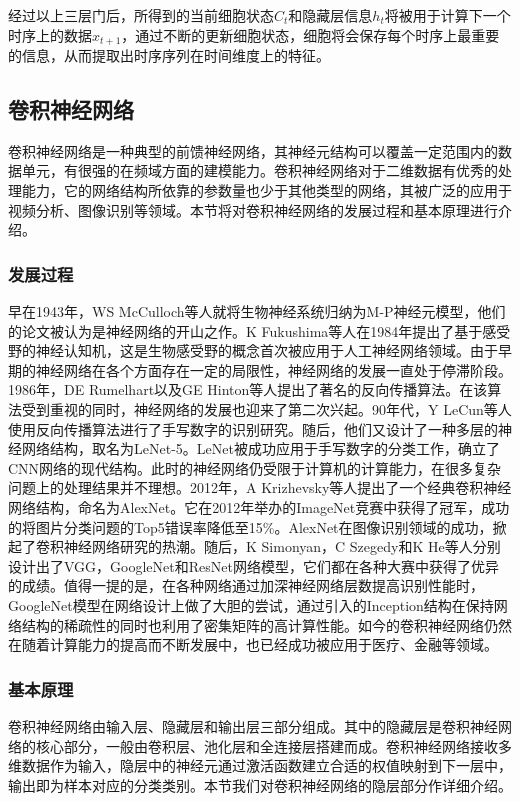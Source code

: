 经过以上三层门后，所得到的当前细胞状态$C_t$和隐藏层信息$h_t$将被用于计算下一个时序上的数据$x_{t+1}$，通过不断的更新细胞状态，细胞将会保存每个时序上最重要的信息，从而提取出时序序列在时间维度上的特征。

\subsection{卷积神经网络}
\label{sec:cnn}
卷积神经网络是一种典型的前馈神经网络，其神经元结构可以覆盖一定范围内的数据单元，有很强的在频域方面的建模能力。卷积神经网络对于二维数据有优秀的处理能力，它的网络结构所依靠的参数量也少于其他类型的网络，其被广泛的应用于视频分析、图像识别等领域。本节将对卷积神经网络的发展过程和基本原理进行介绍。
\subsubsection{发展过程}
早在1943年，WS McCulloch等人就将生物神经系统归纳为M-P神经元模型，他们的论文被认为是神经网络的开山之作\supercite{mcculloch1943logical}。K Fukushima等人在1984年提出了基于感受野的神经认知机，这是生物感受野的概念首次被应用于人工神经网络领域\supercite{fukushima1982neocognitron}。由于早期的神经网络在各个方面存在一定的局限性，神经网络的发展一直处于停滞阶段。1986年，DE Rumelhart以及GE Hinton等人提出了著名的反向传播算法\supercite{7}。在该算法受到重视的同时，神经网络的发展也迎来了第二次兴起。90年代，Y LeCun等人使用反向传播算法进行了手写数字的识别研究\supercite{lecun1990handwritten}。随后，他们又设计了一种多层的神经网络结构，取名为LeNet-5\supercite{6}。LeNet被成功应用于手写数字的分类工作，确立了CNN网络的现代结构。此时的神经网络仍受限于计算机的计算能力，在很多复杂问题上的处理结果并不理想。2012年，A Krizhevsky等人提出了一个经典卷积神经网络结构，命名为AlexNet\supercite{8}。它在2012年举办的ImageNet竞赛中获得了冠军，成功的将图片分类问题的Top5错误率降低至15\%。AlexNet在图像识别领域的成功，掀起了卷积神经网络研究的热潮。随后，K Simonyan，C Szegedy和K He等人分别设计出了VGG\supercite{9}，GoogleNet\supercite{10}和ResNet\supercite{11}网络模型，它们都在各种大赛中获得了优异的成绩。值得一提的是，在各种网络通过加深神经网络层数提高识别性能时，GoogleNet模型在网络设计上做了大胆的尝试，通过引入的Inception结构在保持网络结构的稀疏性的同时也利用了密集矩阵的高计算性能。如今的卷积神经网络仍然在随着计算能力的提高而不断发展中，也已经成功被应用于医疗、金融等领域。

\subsubsection{基本原理}
卷积神经网络由输入层、隐藏层和输出层三部分组成。其中的隐藏层是卷积神经网络的核心部分，一般由卷积层、池化层和全连接层搭建而成。卷积神经网络接收多维数据作为输入，隐层中的神经元通过激活函数建立合适的权值映射到下一层中，输出即为样本对应的分类类别。本节我们对卷积神经网络的隐层部分作详细介绍。

